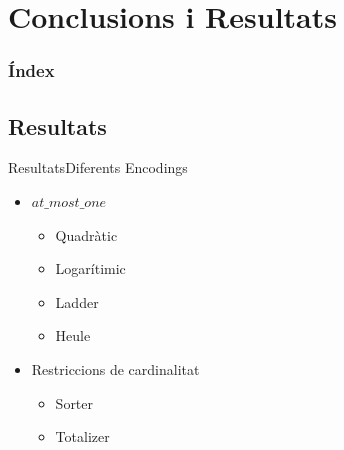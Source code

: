 \documentclass[13pt]{beamer}
\begin{document}
  \section{Conclusions i Resultats}
  \begin{frame}
    \frametitle{Índex}
    \tableofcontents[currentsection]
  \end{frame}
  \subsection{Resultats}

  \begin{frame}{Resultats}{Diferents Encodings}
    \begin{itemize}
      \item $at\_most\_one$
      \begin{itemize}
        \item Quadràtic
        \item Logarítimic
        \item Ladder
        \item Heule
      \end{itemize}
      \item Restriccions de cardinalitat
      \begin{itemize}
        \item Sorter
        \item Totalizer
      \end{itemize}
    \end{itemize}
  \end{frame}
  
\end{document}
